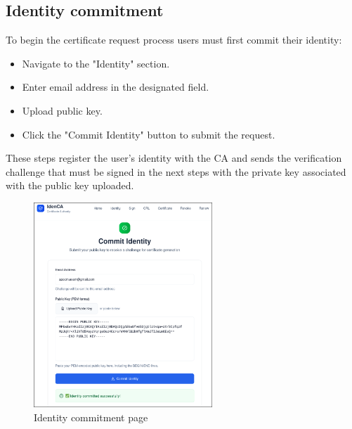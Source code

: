 \subsection{Identity commitment}
To begin the certificate request process users must first commit their identity:
\begin{itemize}
    \item Navigate to the "Identity" section.
    \item Enter email address in the designated field.
    \item Upload public key.
    \item Click the "Commit Identity" button to submit the request.
\end{itemize}
These steps register the user's identity with the CA and sends the verification challenge that must 
be signed in the next steps with the private key associated with the public key uploaded.
\begin{figure}[h!]
    \centering
    \includegraphics[keepaspectratio, width=0.6\textwidth]{Pic/2_identity_committed.png}
    \caption{Identity commitment page}
    \label{fig:identity-commitment}
\end{figure}

